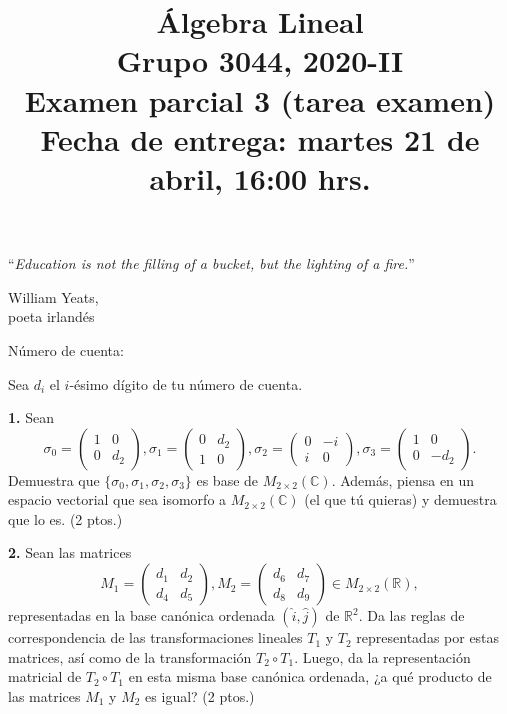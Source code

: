 \documentclass[a4paper]{article}
\begin{document}
\title{Álgebra Lineal \\ Grupo 3044, 2020-II \\ Examen parcial 3 (tarea examen) \\ Fecha de entrega: martes 21 de abril, 16:00 hrs.}
\date{}
\maketitle

\epigraph{``\textit{Education is not the filling of a bucket, but the lighting of a fire.}''}{\textemdash William Yeats, \\ poeta irlandés}

Número de cuenta:

\vspace{5mm}

\noindent Sea $d_i$ el $i$-ésimo dígito de tu número de cuenta.

\vspace{5mm}
\textbf{1.} Sean \[\sigma_0=\begin{pmatrix}1&0\\0&d_2\end{pmatrix}, \sigma_1=\begin{pmatrix}0&d_2\\1&0\end{pmatrix},\sigma_2=\begin{pmatrix}0&-i\\i&0\end{pmatrix}, \sigma_3=\begin{pmatrix}1&0\\0&-d_2\end{pmatrix}.\] Demuestra que $\{\sigma_0, \sigma_1, \sigma_2, \sigma_3\}$ es base de $M_{2\times 2}(\mathbb{C})$. Además, piensa en un espacio vectorial que sea isomorfo a $M_{2\times 2}(\mathbb{C})$ (el que tú quieras) y demuestra que lo es. (2 ptos.)

\vspace{5mm}
\textbf{2.} Sean las matrices \[M_1=\begin{pmatrix}d_1&d_2 \\ d_4&d_5\end{pmatrix}, M_2=\begin{pmatrix}d_6&d_7 \\ d_8&d_9\end{pmatrix}\in M_{2\times 2}(\mathbb{R}),\] \noindent representadas en la base canónica ordenada $(\hat{i},\hat{j})$ de $\mathbb{R}^2$. Da las reglas de correspondencia de las transformaciones lineales $T_1$ y $T_2$ representadas por estas matrices, así como de la transformación $T_2\circ T_1$. Luego, da la representación matricial de $T_2\circ T_1$ en esta misma base canónica ordenada, ¿a qué producto de las matrices $M_1$ y $M_2$ es igual? (2 ptos.)
\end{document}
